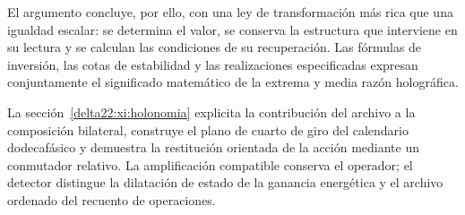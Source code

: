El argumento concluye, por ello, con una ley de transformación más rica que una igualdad escalar: se determina el valor, se conserva la estructura que interviene en su lectura y se calculan las condiciones de su recuperación. Las fórmulas de inversión, las cotas de estabilidad y las realizaciones especificadas expresan conjuntamente el significado matemático de la extrema y media razón holográfica.

\par
La sección~\ref{delta22:xi:holonomia} explicita la contribución del archivo a la composición bilateral, construye el plano de cuarto de giro del calendario dodecafásico y demuestra la restitución orientada de la acción mediante un conmutador relativo. La amplificación compatible conserva el operador; el detector distingue la dilatación de estado de la ganancia energética y el archivo ordenado del recuento de operaciones.

